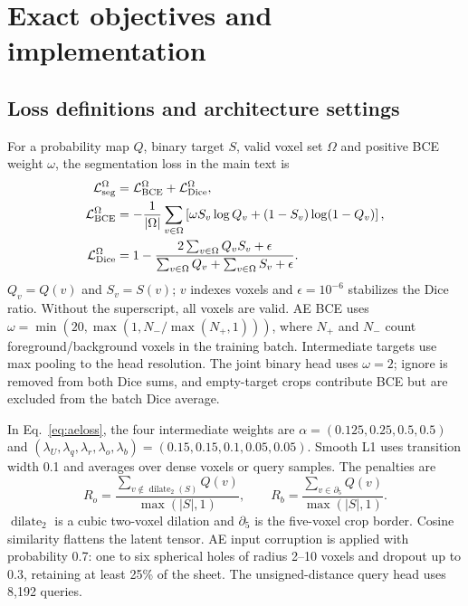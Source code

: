 \section{Exact objectives and implementation}
\label{supp:losses}



\subsection{Loss definitions and architecture settings}
For a probability map $Q$, binary target $S$, valid voxel set $\Omega$ and
positive BCE weight $\omega$, the segmentation loss in the main text is
\begin{align}
 \mathcal L_{\rm seg}^{\Omega}&=\mathcal L_{\rm BCE}^{\Omega}
                                  +\mathcal L_{\rm Dice}^{\Omega},\nonumber\\
 \mathcal L_{\rm BCE}^{\Omega}&=-\frac{1}{|\Omega|}\sum_{v\in\Omega}
 \left[\omega S_v\log Q_v+(1-S_v)\log(1-Q_v)\right],\nonumber\\
 \mathcal L_{\rm Dice}^{\Omega}&=1-
 \frac{2\sum_{v\in\Omega}Q_vS_v+\epsilon}
 {\sum_{v\in\Omega}Q_v+\sum_{v\in\Omega}S_v+\epsilon}.
 \label{eq:segexact}
\end{align}
$Q_v=Q(v)$ and $S_v=S(v)$; $v$ indexes voxels and $\epsilon=10^{-6}$ stabilizes the Dice ratio.
Without the superscript, all voxels are valid. AE BCE uses
$\omega=\min(20,\max(1,N_-/\max(N_+,1)))$, where $N_+$ and $N_-$ count
foreground/background voxels in the training batch. Intermediate targets use
max pooling to the head resolution. The joint binary head uses $\omega=2$;
ignore is removed from both Dice sums, and empty-target crops contribute BCE
but are excluded from the batch Dice average.

In Eq.~\ref{eq:aeloss}, the four intermediate weights are
$\alpha=(0.125,0.25,0.5,0.5)$ and
$(\lambda_U,\lambda_q,\lambda_r,\lambda_o,\lambda_b)
=(0.15,0.15,0.1,0.05,0.05)$.
Smooth L1 uses transition width 0.1 and averages over dense voxels or query
samples. The penalties are
\begin{equation}
 R_o=\frac{\sum_{v\notin\operatorname{dilate}_2(S)}Q(v)}{\max(|S|,1)},\qquad
 R_b=\frac{\sum_{v\in\partial_5}Q(v)}{\max(|S|,1)}.
\end{equation}
$\operatorname{dilate}_2$ is a cubic two-voxel dilation and $\partial_5$ is the
five-voxel crop border. Cosine similarity flattens the latent tensor.
AE input corruption is applied with probability 0.7: one to six spherical
holes of radius 2--10 voxels and dropout up to 0.3, retaining at least 25\%
of the sheet. The unsigned-distance query head uses 8,192 queries.

